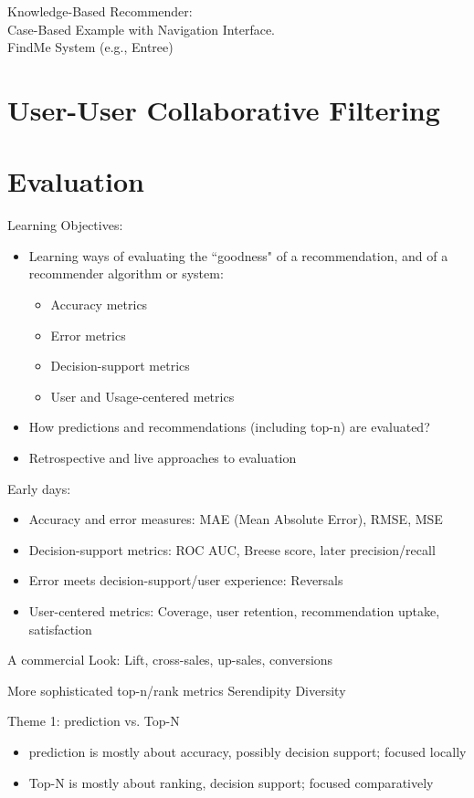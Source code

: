 \documentclass[fleqn,twoside]{article}
\begin{document}
Knowledge-Based Recommender: \\
Case-Based Example with Navigation Interface. \\
FindMe System (e.g., Entree)



\section{User-User Collaborative Filtering}

\section{Evaluation}
Learning Objectives:
\begin{itemize}
\item Learning ways of evaluating the ``goodness" of a recommendation, and of a recommender algorithm or system:
	\begin{itemize}
	\item Accuracy metrics
	\item Error metrics
	\item Decision-support metrics
	\item User and Usage-centered metrics
	\end{itemize}

\item How predictions and recommendations (including top-n) are evaluated?
\item Retrospective and live approaches to evaluation
\end{itemize}

Early days:
\begin{itemize}
\item Accuracy and error measures:  MAE (Mean Absolute Error), RMSE, MSE
\item Decision-support metrics:  ROC AUC, Breese score, later precision/recall
\item Error meets decision-support/user experience:  Reversals
\item User-centered metrics:  Coverage, user retention, recommendation uptake, satisfaction
\end{itemize}

A commercial Look:
Lift, cross-sales, up-sales, conversions

More sophisticated top-n/rank metrics
Serendipity
Diversity

Theme 1: prediction vs. Top-N
\begin{itemize}
\item prediction is mostly about accuracy, possibly decision support; focused locally
\item Top-N is mostly about ranking, decision support; focused comparatively
\end{itemize}
\end{document}
